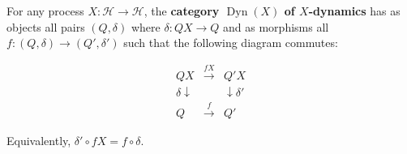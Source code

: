 For any process $X: \mathcal{H} \to \mathcal{H}$, the \textbf{category $\operatorname{Dyn}(X)$ of $X$-dynamics} has as objects all pairs $(Q, \delta)$ where $\delta: QX \to Q$ and as morphisms all $f: (Q, \delta) \to (Q', \delta')$ such that the following diagram commutes:

$$\begin{array}{ccc}
QX & \xrightarrow{fX} & Q'X \\
{\scriptstyle\delta}\downarrow & & \downarrow{\scriptstyle\delta'} \\
Q & \xrightarrow{f} & Q'
\end{array}$$

Equivalently, $\delta' \circ fX = f \circ \delta$.
